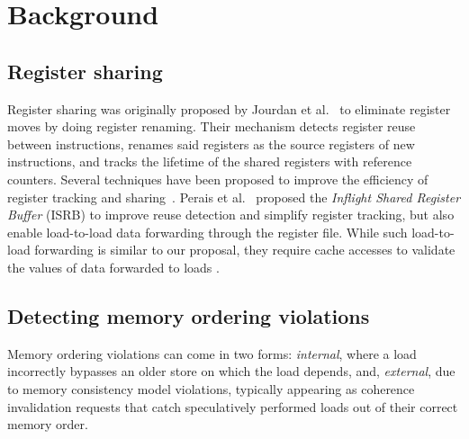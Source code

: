 \documentclass{sig-alternate}
\begin{document}





























\section{Background}

\subsection{Register sharing}
Register sharing was originally proposed by Jourdan et al.~\cite{RS/jourdan98novel} to eliminate register moves by doing register renaming. Their mechanism detects register reuse between instructions, renames said registers as the source registers of new instructions, and tracks the lifetime of the shared registers with reference counters. Several techniques have been proposed to improve the efficiency of register tracking and sharing~\cite{RS/roth2008physical, RS/battle2012flexible, RS/perais16register}. Perais et al.~\cite{ISRB/perais16} proposed the \textit{Inflight Shared Register Buffer} (ISRB) to improve reuse detection and simplify register tracking, but also enable load-to-load data forwarding through the register file. While such load-to-load forwarding is similar to our proposal, they require cache accesses to validate the values of data forwarded to loads . 


\subsection{Detecting memory ordering violations}
Memory ordering violations can come in two forms: \textit{internal}, where a load incorrectly bypasses an older store on which the load depends, and, \textit{external}, due to memory consistency model violations, typically appearing as coherence invalidation requests that catch speculatively performed loads out of their correct memory order.
\end{document}
